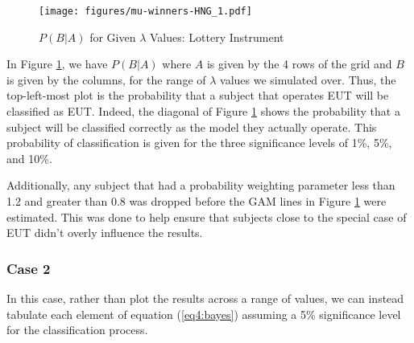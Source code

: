 \documentclass[../main.tex]{subfiles}
\providecommand{\DIFaddbeginFL}{} %
\providecommand{\DIFaddendFL}{} %
\providecommand{\DIFdelbeginFL}{} %
\providecommand{\DIFdelendFL}{} %
\begin{document}
\begin{figure}[hp!]
	\center
	\caption{$P(B|A)$ for Given $\lambda$ Values: \textcite{Harrison2016} Lottery Instrument}
	\DIFdelbeginFL %
\DIFdelendFL \DIFaddbeginFL \texttt{[image: figures/mu-winners-HNG\_1.pdf]}
	\DIFaddendFL \label{fig:HNG_mu_PBA}
\end{figure}

In Figure \ref{fig:HNG_mu_PBA}, we have $P(B|A)$ where $A$ is given by the 4 rows of the grid and $B$ is given by the columns, for the range of $\lambda$ values we simulated over.
Thus, the top-left-most plot is the probability that a subject that operates EUT will be classified as EUT.
Indeed, the diagonal of Figure \ref{fig:HNG_mu_PBA} shows the probability that a subject will be classified correctly as the model they actually operate.
This probability of classification is given for the three significance levels of 1\%, 5\%, and 10\%.

Additionally, any subject that had a probability weighting parameter less than 1.2 and greater than 0.8 was dropped before the GAM lines in Figure \ref{fig:HNG_mu_PBA} were estimated.
This was done to help ensure that subjects close to the special case of EUT didn't overly influence the results.

\subsubsection{Case 2}

In this case, rather than plot the results across a range of values, we can instead tabulate each element of equation (\ref{eq4:bayes}) assuming a 5\% significance level for the classification process.
\end{document}
